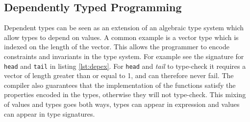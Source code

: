 \documentclass[parskip=half]{scrartcl}
\begin{document}
\subsection{Dependently Typed Programming}

Dependent types can be seen as an extension of an algebraic type system which
allow types to depend on values.
A common example is a vector type which is indexed on the length of
the vector. This allows the programmer to encode constraints and invariants in
the type system. For example see the signature for \texttt{head} and
\texttt{tail} in listing \ref{lst:depex}.  For \texttt{head} and \textit{tail} to type-check it requires a vector of
length greater than or equal to 1, and can therefore never fail.
The compiler also guarantees that the implementation of the functions satisfy
the properties encoded in the types, otherwise they will not type-check.
This mixing of values
and types goes both ways, types can appear in expression and values can appear
in type signatures.





\end{document}
